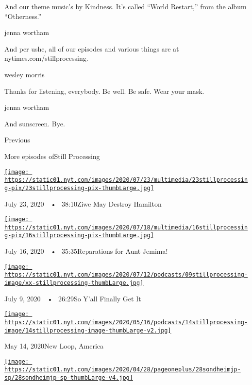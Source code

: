 And our theme music's by Kindness. It's called ``World Restart,'' from
the album ``Otherness.''

jenna wortham

And per ushe, all of our episodes and various things are at
nytimes.com/stillprocessing.

wesley morris

Thanks for listening, everybody. Be well. Be safe. Wear your mask.

jenna wortham

And sunscreen. Bye.

Previous

More episodes ofStill Processing

\href{https://www.nytimes.com/2020/07/23/podcasts/hamilton-ziwe-discomfort.html?action=click\&module=audio-series-bar\&region=header\&pgtype=Article}{\texttt{[image: https://static01.nyt.com/images/2020/07/23/multimedia/23stillprocessing-pix/23stillprocessing-pix-thumbLarge.jpg]}}

July 23, 2020~~•~ 38:10Ziwe May Destroy Hamilton

\href{https://www.nytimes.com/2020/07/16/podcasts/reparations-for-aunt-jemima.html?action=click\&module=audio-series-bar\&region=header\&pgtype=Article}{\texttt{[image: https://static01.nyt.com/images/2020/07/18/multimedia/16stillprocessing-pix/16stillprocessing-pix-thumbLarge.jpg]}}

July 16, 2020~~•~ 35:35Reparations for Aunt Jemima!

\href{https://www.nytimes.com/2020/07/09/podcasts/still-processing-black-lives-matter.html?action=click\&module=audio-series-bar\&region=header\&pgtype=Article}{\texttt{[image: https://static01.nyt.com/images/2020/07/12/podcasts/09stillprocessing-image/xx-stillprocessing-thumbLarge.jpg]}}

July 9, 2020~~•~ 26:29So Y'all Finally Get It

\href{https://www.nytimes.com/2020/05/14/podcasts/still-processing-westworld-hollywood-utopia-dystopia.html?action=click\&module=audio-series-bar\&region=header\&pgtype=Article}{\texttt{[image: https://static01.nyt.com/images/2020/05/16/podcasts/14stillprocessing-image/14stillprocessing-image-thumbLarge-v2.jpg]}}

May 14, 2020New Loop, America

\href{https://www.nytimes.com/2020/05/07/podcasts/still-processing-internet-vulnerability-sondheim-parks-recreation.html?action=click\&module=audio-series-bar\&region=header\&pgtype=Article}{\texttt{[image: https://static01.nyt.com/images/2020/04/28/pageoneplus/28sondheimjp-sp/28sondheimjp-sp-thumbLarge-v4.jpg]}}

